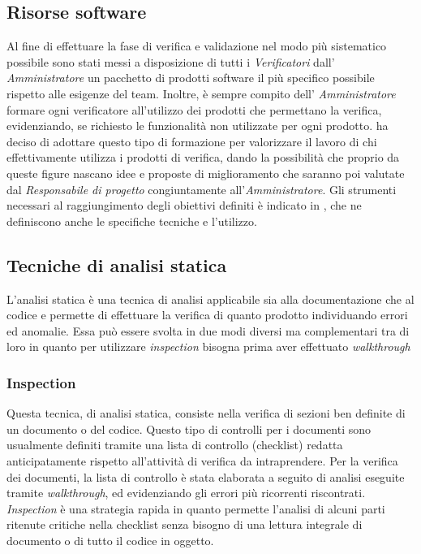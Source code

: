 \subsection{Risorse software}
Al fine di effettuare la fase di verifica e validazione nel modo più sistematico possibile sono stati messi a disposizione di tutti i \textit{Verificatori} dall' \textit{Amministratore} un pacchetto di prodotti software il più specifico possibile rispetto alle esigenze del team. Inoltre, è sempre compito dell' \textit{Amministratore} formare ogni verificatore all'utilizzo dei prodotti che permettano la verifica, evidenziando, se richiesto le funzionalità non utilizzate per ogni prodotto. \gruppo{} ha deciso di adottare questo tipo di formazione per valorizzare il lavoro di chi effettivamente utilizza i prodotti di verifica, dando la possibilità che proprio da queste figure nascano idee e proposte di miglioramento che saranno poi valutate dal \textit{Responsabile di progetto} congiuntamente all'\textit{Amministratore}.
Gli strumenti necessari al raggiungimento degli obiettivi definiti è indicato in \infoNDP, che ne definiscono anche le specifiche tecniche e l'utilizzo.
\subsection{Tecniche di analisi statica}
L'analisi statica è una tecnica di analisi applicabile sia alla documentazione che al codice e permette di effettuare la verifica di quanto prodotto individuando errori ed anomalie. Essa può essere svolta in due modi diversi ma complementari tra di loro in quanto per utilizzare \textit{inspection} bisogna prima aver effettuato \textit{walkthrough}
\subsubsection{Inspection}
Questa tecnica, di analisi statica, consiste nella verifica di sezioni ben definite di un documento o del codice. Questo tipo di controlli per i documenti sono usualmente definiti tramite una lista di controllo (checklist) redatta anticipatamente rispetto all'attività di verifica da intraprendere. Per la verifica dei documenti, la lista di controllo è stata elaborata a seguito di analisi eseguite tramite \textit{walkthrough}, ed evidenziando gli errori più ricorrenti riscontrati. \textit{Inspection} è una strategia rapida in quanto permette l'analisi di alcuni parti ritenute critiche nella checklist senza bisogno di una lettura integrale di documento o di tutto il codice in oggetto.
